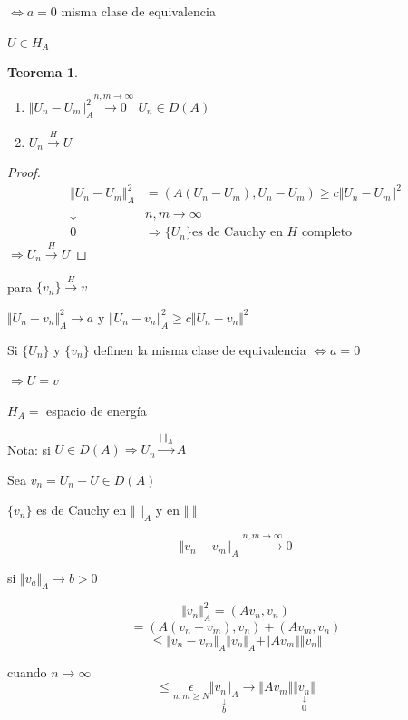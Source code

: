 \documentclass[a4paper,10pt]{book}
\def \ep{\epsilon}
\newtheorem{theorem}{Teorema}
\begin{document}
$\Leftrightarrow a=0$ misma clase de equivalencia

$U\in H_A $

\begin{theorem}
\begin{enumerate}
    \item $\Vert U_n -U_m\Vert^2_A  \overset{n,m\rightarrow \infty}{\rightarrow 0 }$ $U_n\in D(A)$
    \item $U_n \overset{H}{\rightarrow}U$
\end{enumerate}
    
\end{theorem}

\begin{proof}
    \begin{align*}
        \Vert U_n-U_m\Vert_A^2 & =(A(U_n-U_m),U_n-U_m) \geq c\Vert U_n-U_m\Vert^2\\
        \downarrow& n,m\rightarrow \infty \\
        0&\Rightarrow \{ U_n\} \text{es de Cauchy en } H \text{ completo} 
    \end{align*}
    $\Rightarrow  U_n\overset{H}{\rightarrow} U $
\end{proof}

para $\{ v_n \} \overset{H}{\rightarrow} v$

$\Vert U_n-v_n \Vert_A^2 \rightarrow a $ y  $\Vert U_n-v_n \Vert_A^2 \geq c\Vert U_n-v_n\Vert^2 $ 

Si $\{ U_n\}$ y $\{ v_n\}$ definen la misma clase de equivalencia $\Leftrightarrow a=0$

$\Rightarrow U=v$ 

$H_A=$ espacio de energía

Nota: si $U\in D(A)\Rightarrow U_n\overset{\vert \;\Vert_A} {\rightarrow} A$

Sea $v_n = U_n - U \in D(A) $ 

$\{ v_n\}$ es de Cauchy en $\Vert \; \Vert_A$ y en $\Vert \;\Vert$

\[ 
\Vert v_n -v_m \Vert_A \overset{n,m\rightarrow \infty}{\rightarrow} 0 
\]

si $\Vert v_a\Vert_A \rightarrow b >0$

\[
\Vert v_n \Vert_A^2 = (Av_n, v_n) 
\]
\[
=(A(v_n-v_m),v_n) + (Av_m,v_n)
\]
\[
\leq \Vert v_n - v_m\Vert_A \Vert v_n\Vert_A  + \Vert A v_m\Vert \Vert v_n\Vert 
\]

cuando $n\rightarrow\infty$
\[
\leq \underset{n,m\geq N }{\ep} \underset{\overset{\downarrow}{b}}{\Vert v_n\Vert_A}  \rightarrow \Vert A v_m \Vert \underset{\overset{\downarrow}{0}}{ \Vert v_n\Vert }
\]
\end{document}
